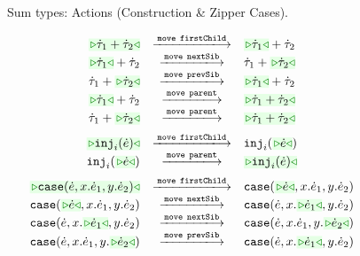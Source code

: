 \begin{figure}
{\begin{mathpar}
\end{mathpar}
}
\caption{Sum types: Actions (Construction \& Zipper Cases).}
\label{fig:sum-action}
\end{figure}

\begin{figure}
\begin{displaymath}
\begin{array}{@{}rcl}
  \TABperformMove
      {\zwsel{\tsum{\htau_1}{\htau_2}}}
      {\aMove{\dChild}}
      {      {\tsum{\zwsel{\htau_1}}{\htau_2}}}
  \\
  \TABperformMove
      {      {\tsum{\zwsel{\htau_1}}{\htau_2}}}
      {\aMove{\dNext}}
      {      {\tsum{{\htau_1}}{\zwsel{\htau_2}}}}
  \\
  \TABperformMove
      {      {\tsum{{\htau_1}}{\zwsel{\htau_2}}}}
      {\aMove{\dPrev}}
      {      {\tsum{\zwsel{\htau_1}}{\htau_2}}}
  \\
  \TABperformMove
      {      {\tsum{\zwsel{\htau_1}}{\htau_2}}}
      {\aMove{\dParent}}
      {\zwsel{\tsum{{\htau_1}}{{\htau_2}}}}
  \\
  \TABperformMove
      {      {\tsum{{\htau_1}}{{\zwsel{\htau_2}}}}}
      {\aMove{\dParent}}
      {\zwsel{\tsum{{\htau_1}}{\htau_2}}}
  \\[2mm]
  \TABperformMove
      {\zwsel{\hinj{i}{\hexp}}}
      {\aMove{\dChild}}
      {\hinj{i}{\zwsel{\hexp}}}      
  \\
  \TABperformMove
      {\hinj{i}{\zwsel{\hexp}}}      
      {\aMove{\dParent}}
      {\zwsel{\hinj{i}{\hexp}}}
  \\[2mm]
  \TABperformMove
      {\zwsel{\hcase{\hexp}{x}{\hexp_1}{y}{\hexp_2}}}
      {\aMove{\dChild}}
      {      {\hcase{\zwsel{\hexp}}{x}{\hexp_1}{y}{\hexp_2}}}
  \\
  \TABperformMove
      {      {\hcase{\zwsel{\hexp}}{x}{\hexp_1}{y}{\hexp_2}}}
      {\aMove{\dNext}}
      {      {\hcase{{\hexp}}{x}{\zwsel{\hexp_1}}{y}{\hexp_2}}}
  \\
  \TABperformMove
      {      {\hcase{{\hexp}}{x}{\zwsel{\hexp_1}}{y}{\hexp_2}}}
      {\aMove{\dNext}}
      {      {\hcase{{\hexp}}{x}{{\hexp_1}}{y}{\zwsel{\hexp_2}}}}
  \\
  \TABperformMove
      {      {\hcase{{\hexp}}{x}{{\hexp_1}}{y}{\zwsel{\hexp_2}}}}
      {\aMove{\dPrev}}
      {      {\hcase{{\hexp}}{x}{\zwsel{\hexp_1}}{y}{\hexp_2}}}

\end{array}
\end{displaymath}
\end{figure}

